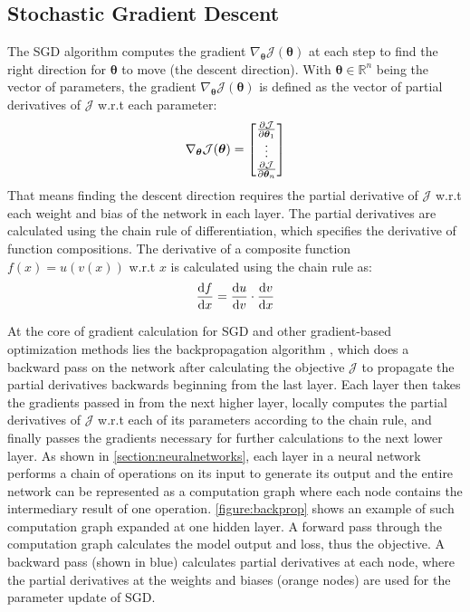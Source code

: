 \subsection{Stochastic Gradient Descent} \label{section:sgd}
The \ac{SGD} algorithm computes the gradient
$\nabla_{\bm{\theta}} \mathcal{J}(\bm{\theta})$ at each 
step to find the right direction for $\bm{\theta}$ to
move (the descent direction). With 
$\bm{\theta} \in \mathbb{R}^n$ being the vector of parameters, 
the gradient $\nabla_{\bm{\theta}} \mathcal{J}(\bm{\theta})$
is defined as the vector of partial derivatives of 
$\mathcal{J}$ w.r.t each parameter: 
\begin{equation}
    \nabla_{\bm{\theta}} \mathcal{J}(\bm{\theta}) = 
    \begin{bmatrix}
        \pdv{\mathcal{J}}{\bm{\theta}_1}\\
        \vdots\\
        \pdv{\mathcal{J}}{\bm{\theta}_n}
    \end{bmatrix}
\end{equation}
That means finding the descent direction requires the 
partial derivative of $\mathcal{J}$ w.r.t each 
weight and bias of the network in each layer. The partial
derivatives are calculated using the chain rule of 
differentiation, which specifies the derivative of
function compositions. The derivative of a composite function 
$f(x) = u(v(x))$ w.r.t $x$ is calculated using the chain 
rule as:
\begin{equation}
    \dv{f}{x} = \dv{u}{v}\cdot\dv{v}{x}
\end{equation}

At the core of gradient calculation for \ac{SGD} and 
other gradient-based optimization methods lies the
backpropagation algorithm \parencite{backprop}, which 
does a backward pass on the network after calculating 
the objective $\mathcal{J}$ to propagate the partial
derivatives backwards beginning from the last layer. 
Each layer then takes the gradients passed in from the 
next higher layer, locally computes the partial derivatives 
of $\mathcal{J}$ w.r.t each of its parameters according to
the chain rule, and finally passes the gradients necessary
for further calculations to the next lower layer. As 
shown in \autoref{section:neuralnetworks}, each layer
in a neural network performs a chain of operations on its 
input to generate its output and the entire network can be 
represented as a computation graph where each node 
contains the intermediary result of one operation.  
\autoref{figure:backprop} shows an example of such 
computation graph expanded at one hidden layer. 
A forward pass through the computation graph calculates
the model output and loss, thus the objective. A backward
pass (shown in blue) calculates partial derivatives at
each node, where the partial derivatives at the weights 
and biases (orange nodes) are used for the 
parameter update of \ac{SGD}.


